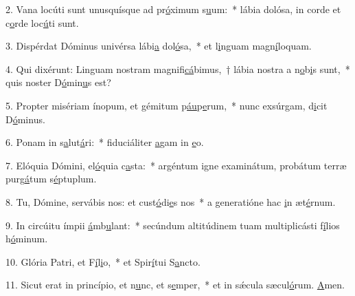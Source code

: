 2. Vana locúti sunt unusquísque ad pr\uline{ó}ximum s\uline{u}um:~* lábia dolósa, in corde et c\uline{o}rde loc\uline{ú}ti sunt.\par 
3. Dispérdat Dóminus univérsa lábi\uline{a} dol\uline{ó}sa,~* et l\uline{i}nguam magn\uline{í}loquam.\par 
4. Qui dixérunt: Linguam nostram magnifi\uline{cá}bimus,~† lábia nostra a n\uline{o}b\uline{i}s sunt,~* quis noster D\uline{ó}min\uline{u}s est?\par 
5. Propter misériam ínopum, et gémitum p\uline{áu}p\uline{e}rum,~* nunc exsúrgam, d\uline{i}cit D\uline{ó}minus.\par 
6. Ponam in s\uline{a}lut\uline{á}ri:~* fiduciáliter \uline{a}gam in \uline{e}o.\par 
7. Elóquia Dómini, el\uline{ó}quia c\uline{a}sta:~* argéntum igne examinátum, probátum terræ purg\uline{á}tum s\uline{é}ptuplum.\par 
8. Tu, Dómine, servábis nos: et cust\uline{ó}di\uline{e}s nos~* a generatióne hac \uline{i}n æt\uline{é}rnum.\par 
9. In circúitu ímpii \uline{á}mb\uline{u}lant:~* secúndum altitúdinem tuam multiplicásti f\uline{í}lios h\uline{ó}minum.\par 
10. Glória Patri, et F\uline{í}l\uline{i}o,~* et Spir\uline{í}tui S\uline{a}ncto.\par 
11. Sicut erat in princípio, et n\uline{u}nc, et s\uline{e}mper,~* et in sǽcula sæcul\uline{ó}rum. \uline{A}men.\par 
